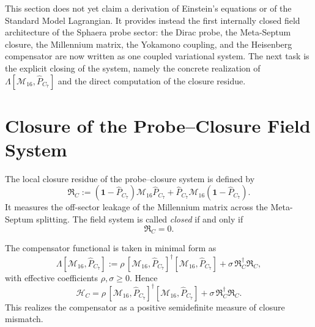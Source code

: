 \begin{remark}
This section does not yet claim a derivation of Einstein's equations or
of the Standard Model Lagrangian.
It provides instead the first internally closed field architecture of
the Sphaera probe sector: the Dirac probe, the Meta-Septum closure, the
Millennium matrix, the Yokamono coupling, and the Heisenberg
compensator are now written as one coupled variational system.
The next task is the explicit closing of the system, namely the concrete
realization of $\Lambda[\mathcal M_{16},\hat P_{C_7}]$ and the direct
computation of the closure residue.

\end{remark}


\section{Closure of the Probe--Closure Field System}
\label{sec:closure-field-system}

\begin{definition}
The local closure residue of the probe--closure system is defined by
\[
  \mathfrak R_C
  :=
  (\mathbf 1-\hat P_{C_7})\mathcal M_{16}\hat P_{C_7}
  + \hat P_{C_7}\mathcal M_{16}(\mathbf 1-\hat P_{C_7}).
\]
It measures the off-sector leakage of the Millennium matrix across the
Meta-Septum splitting.
The field system is called \emph{closed} if and only if
\[
  \mathfrak R_C = 0.
\]
\end{definition}

\begin{definition}
The compensator functional is taken in minimal form as
\[
  \Lambda[\mathcal M_{16},\hat P_{C_7}]
  :=
  \rho\,[\mathcal M_{16},\hat P_{C_7}]^
  \dagger [\mathcal M_{16},\hat P_{C_7}]
  + \sigma\,\mathfrak R_C^
  \dagger \mathfrak R_C,
\]
with effective coefficients $\rho,\sigma\ge 0$.
Hence
\[
  \mathcal H_C
  =
  \rho\,[\mathcal M_{16},\hat P_{C_7}]^
  \dagger [\mathcal M_{16},\hat P_{C_7}]
  + \sigma\,\mathfrak R_C^
  \dagger \mathfrak R_C.
\]
This realizes the compensator as a positive semidefinite measure of
closure mismatch.
\end{definition}

